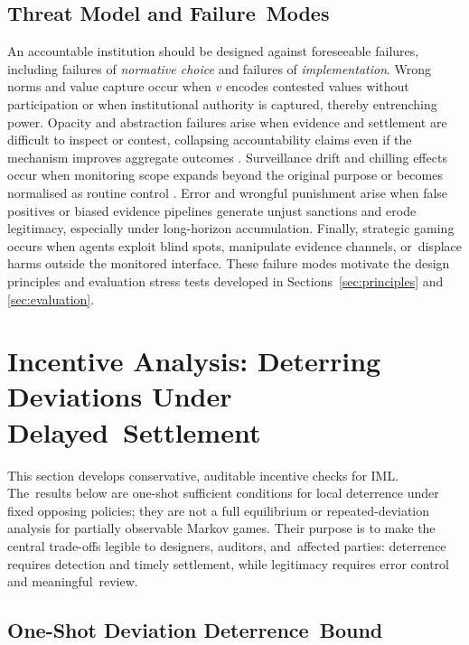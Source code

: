 \documentclass[mca,article,accept,pdftex,oneauthor]{Definitions/mdpi}
\begin{document}
\subsection{Threat Model and Failure~Modes}
\label{sec:failure}

An accountable institution should be designed against foreseeable failures, including failures of \emph{normative choice} and failures of \emph{implementation}. Wrong norms and value capture occur when $v$ encodes contested values without participation or when institutional authority is captured, thereby entrenching power. Opacity and abstraction failures arise when evidence and settlement are difficult to inspect or contest, collapsing accountability claims even if the mechanism improves aggregate outcomes \citep{Burrell2016Opacity,Selbst2019FairnessAbstraction}. Surveillance drift and chilling effects occur when monitoring scope expands beyond the original purpose or becomes normalised as routine control \citep{Lyon2007Surveillance,Zuboff2019}. Error and wrongful punishment arise when false positives or biased evidence pipelines generate unjust sanctions and erode legitimacy, especially under long-horizon accumulation. Finally, strategic gaming occurs when agents exploit blind spots, manipulate evidence channels, or~displace harms outside the monitored interface. These failure modes motivate the design principles and evaluation stress tests developed in Sections~\ref{sec:principles} and \ref{sec:evaluation}.

\section{Incentive Analysis: Deterring Deviations Under Delayed~Settlement}
\label{sec:analysis}

This section develops conservative, auditable incentive checks for IML. The~results below are one-shot sufficient conditions for local deterrence under fixed opposing policies; they are not a full equilibrium or repeated-deviation analysis for partially observable Markov games. Their purpose is to make the central trade-offs legible to designers, auditors, and~affected parties: deterrence requires detection and timely settlement, while legitimacy requires error control and meaningful~review.

\subsection{One-Shot Deviation Deterrence~Bound}
\label{sec:oneshot}
\end{document}
